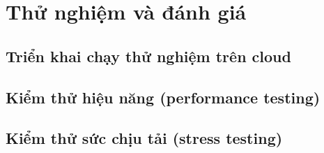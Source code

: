 \chapter{Thử nghiệm và đánh giá}
\section{Triển khai chạy thử nghiệm trên cloud}
\section{Kiểm thử hiệu năng (performance testing)}
\section{Kiểm thử sức chịu tải (stress testing)}
